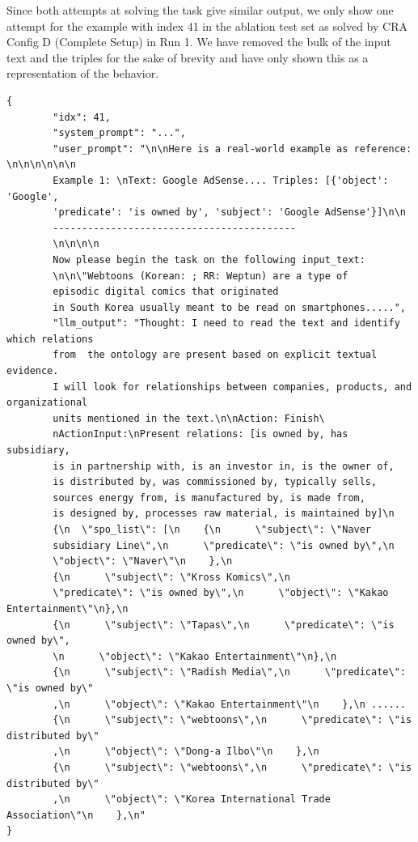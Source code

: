 Since both attempts at solving the task give similar output, we only show one attempt for the example with index 41 in the ablation test set as solved by CRA Config D (Complete Setup) in Run 1. We have removed the bulk of the input text and the triples for the sake of brevity and have only shown this as a representation of the behavior. 

\begin{verbatim}
{
        "idx": 41,
        "system_prompt": "...",
        "user_prompt": "\n\nHere is a real-world example as reference: \n\n\n\n\n\n
        Example 1: \nText: Google AdSense.... Triples: [{'object': 'Google', 
        'predicate': 'is owned by', 'subject': 'Google AdSense'}]\n\n
        ------------------------------------------
        \n\n\n\n
        Now please begin the task on the following input_text: 
        \n\n\"Webtoons (Korean: ; RR: Weptun) are a type of 
        episodic digital comics that originated 
        in South Korea usually meant to be read on smartphones.....",
        "llm_output": "Thought: I need to read the text and identify which relations 
        from  the ontology are present based on explicit textual evidence. 
        I will look for relationships between companies, products, and organizational 
        units mentioned in the text.\n\nAction: Finish\
        nActionInput:\nPresent relations: [is owned by, has subsidiary, 
        is in partnership with, is an investor in, is the owner of, 
        is distributed by, was commissioned by, typically sells, 
        sources energy from, is manufactured by, is made from, 
        is designed by, processes raw material, is maintained by]\n
        {\n  \"spo_list\": [\n    {\n      \"subject\": \"Naver 
        subsidiary Line\",\n      \"predicate\": \"is owned by\",\n      
        \"object\": \"Naver\"\n    },\n    
        {\n      \"subject\": \"Kross Komics\",\n      
        \"predicate\": \"is owned by\",\n      \"object\": \"Kakao Entertainment\"\n},\n    
        {\n      \"subject\": \"Tapas\",\n      \"predicate\": \"is owned by\",
        \n      \"object\": \"Kakao Entertainment\"\n},\n
        {\n      \"subject\": \"Radish Media\",\n      \"predicate\": \"is owned by\"
        ,\n      \"object\": \"Kakao Entertainment\"\n    },\n ......    
        {\n      \"subject\": \"webtoons\",\n      \"predicate\": \"is distributed by\"
        ,\n      \"object\": \"Dong-a Ilbo\"\n    },\n    
        {\n      \"subject\": \"webtoons\",\n      \"predicate\": \"is distributed by\"
        ,\n      \"object\": \"Korea International Trade Association\"\n    },\n"
}
\end{verbatim}
